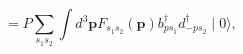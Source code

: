\begin{equation}
=P\underset{s_{1}s_{2}}{\sum }\int d^{3}\mathbf{p}F_{s_{1}s_{2}}(\mathbf{p}%
)b_{ps_{1}}^{\dagger }d_{-ps_{2}}^{\dagger }\mid 0\rangle ,
\end{equation}

